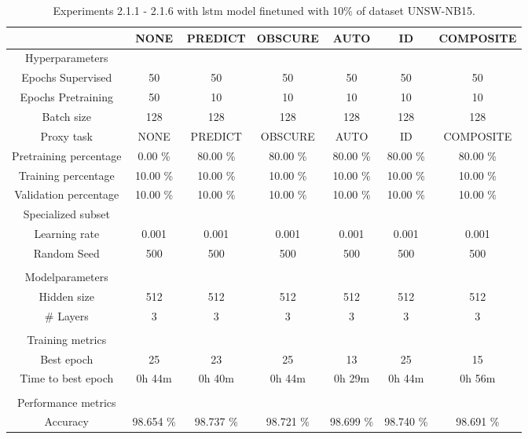 \begin{table}[htb]
    \centering
    \caption{Experiments 2.1.1 - 2.1.6 with \gls{lstm} model finetuned with 10\% of dataset UNSW-NB15.}
    \label{table:results:lstm:flows15_10}
    \begin{tabular}{@{}ccccccc@{}}
        \toprule
         &  NONE &  PREDICT &  OBSCURE &  AUTO &  ID &  COMPOSITE \\
        \midrule
        Hyperparameters &  &  &  &  &  &  \\
        Epochs Supervised &  50 &  50 &  50 &  50 &  50 &  50 \\
        Epochs Pretraining &  50 &  10 &  10 &  10 &  10 &  10 \\
        Batch size &  128 &  128 &  128 &  128 &  128 &  128 \\
        Proxy task &  NONE &  PREDICT &  OBSCURE &  AUTO &  ID &  COMPOSITE \\
        Pretraining percentage &  0.00 \% &  80.00 \% &  80.00 \% &  80.00 \% &  80.00 \% &  80.00 \% \\
        Training percentage &  10.00 \% &  10.00 \% &  10.00 \% &  10.00 \% &  10.00 \% &  10.00 \% \\
        Validation percentage &  10.00 \% &  10.00 \% &  10.00 \% &  10.00 \% &  10.00 \% &  10.00 \% \\
        Specialized subset &   &   &   &   &   &   \\
        Learning rate &  0.001 &  0.001 &  0.001 &  0.001 &  0.001 &  0.001 \\
        Random Seed &  500 &  500 &  500 &  500 &  500 &  500 \\
         \\
        Modelparameters &  &  &  &  &  &  \\
        Hidden size &  512 &  512 &  512 &  512 &  512 &  512 \\
        \# Layers &  3 &  3 &  3 &  3 &  3 &  3 \\
         \\
        Training metrics &  &  &  &  &  &  \\
        Best epoch &  25 &  23 &  25 &  13 &  25 &  15 \\
        Time to best epoch &  0h 44m &  0h 40m &  0h 44m &  0h 29m &  0h 44m &  0h 56m \\
         \\
        Performance metrics &  &  &  &  &  &  \\
        Accuracy &  98.654 \% &  98.737 \% &  98.721 \% &  98.699 \% &  98.740 \% &  98.691 \% \\

\end{tabular}
\end{table}
